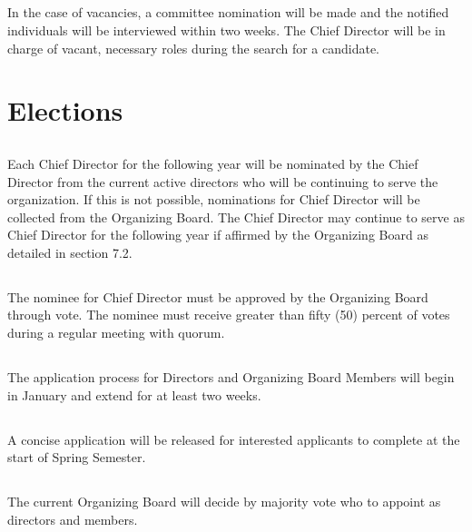 \documentclass[12pt]{article}
\begin{document}
\subsection{} In the case of vacancies, a committee nomination will be made and the notified
individuals will be interviewed within two weeks. The Chief Director will be in charge
of vacant, necessary roles during the search for a candidate. 

\section{Elections}

\subsection{} Each Chief Director for the following year will be nominated by the Chief Director from 
the current active directors who will be continuing to serve the organization.
If this is not possible, nominations for Chief Director 
will be collected from the Organizing Board.
The Chief Director may continue to serve as Chief Director for the following year 
if affirmed by the Organizing Board as detailed in section 7.2.

\subsection{} The nominee for Chief Director must be approved by the Organizing Board
through vote. The nominee must receive greater than fifty (50) percent of votes during
a regular meeting with quorum.

\subsection{} The application process for Directors and Organizing Board Members 
will begin in January and extend for at least two weeks. 

\subsection{} A concise application will be released for interested applicants to complete at the start of Spring Semester.

\subsection{} The current Organizing Board will decide by majority vote who to appoint
as directors and members.
\end{document}
